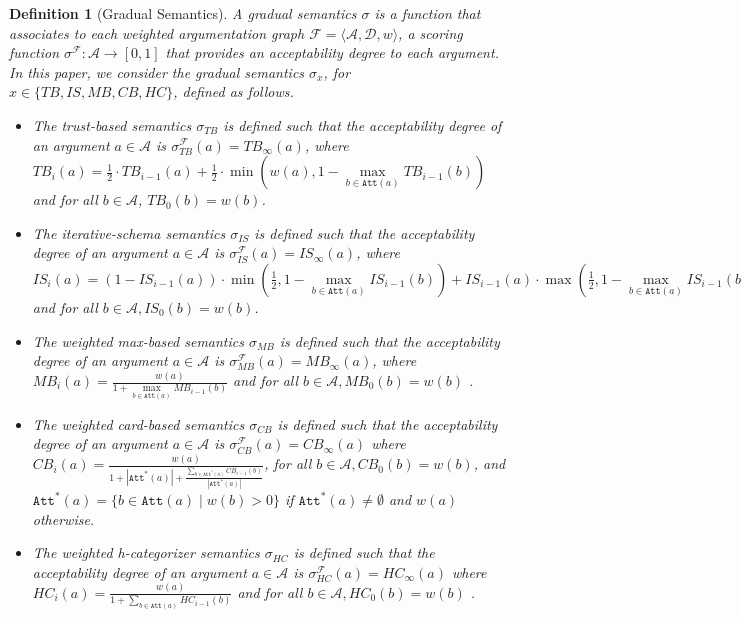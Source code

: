\documentclass{article}
\newcommand{\AF}{\mathcal{F}}
\newcommand{\A}{\mathcal{A}}
\newcommand{\D}{\mathcal{D}}
\newcommand{\Att}{\mathtt{Att}}
\newtheorem{definition}{Definition}
\begin{document}
\begin{definition}[Gradual Semantics]
\label{def:grad_sem}
A gradual semantics $\sigma$ is a function that associates to each weighted argumentation graph $\AF=\langle \A,\D,w \rangle$, a scoring function $\sigma^\AF : \A \to [0,1]$ that provides an acceptability degree to each argument.
%
In this paper, we consider the gradual semantics $\sigma_x$, for $x \in \{TB,IS, MB, CB, HC\}$, defined as follows.
\begin{itemize}
    \item The \emph{trust-based} semantics $\sigma_{TB}$ \cite{TB-sem} is defined such that the acceptability degree of an argument $a\in \A$ is  $\sigma_{TB}^\AF(a)  = TB_\infty(a)$, where
    $TB_i(a) = \frac{1}{2} \cdot TB_{i-1}(a)+\frac{1}{2} \cdot  \min(w(a),1-\max\limits_{b \in \Att(a)} TB_{i-1}(b))$ and for all $b \in \A$, $TB_0(b) = w(b)$.
    
    \item The \emph{iterative-schema} semantics $\sigma_{IS} $ \cite{IS-sem} is defined such that the acceptability degree of an argument $a\in \A$ is $\sigma_{IS}^\AF(a) = IS_\infty(a)$, where $IS_i(a)=(1-IS_{i-1}(a)) \cdot \min(\frac{1}{2},1-\max\limits_{b \in \Att(a)} IS_{i-1}(b))+IS_{i-1}(a) \cdot \max(\frac{1}{2},1-\max\limits_{b \in \Att(a)} IS_{i-1}(b))$ and for all $b \in \A, IS_0(b) = w(b)$.
    
    \item The \emph{weighted max-based} semantics $\sigma_{MB}$ \cite{AMGOUD2022103607} is defined such that the acceptability degree of an argument $a\in \A$ is $\sigma_{MB}^\AF(a) = MB_\infty(a)$, where $MB_i(a)=\frac{w(a)}{1+\max\limits_{b \in \Att(a)} MB_{i-1}(b)}$ and for all $b \in \A, MB_0(b) = w(b)$
    .
    
    
    \item The \emph{weighted card-based} semantics $\sigma_{CB}$ \cite{AMGOUD2022103607} is defined such that the acceptability degree of an argument $a\in \A$ is $\sigma^\AF_{CB}(a) = CB_\infty(a)$ where
    $CB_i(a)=\frac{w(a)}{1+|\Att^*(a)|+ \frac{\sum\limits_{b \in \Att^*(a)} CB_{i-1}(b)}{|\Att^*(a)|}}$, for all $b \in \A, CB_0(b) = w(b)$, and $\Att^*(a) = \{ b \in \Att(a) \mid w(b)>0\}$ if $\Att^*(a) \neq \emptyset$ and $w(a)$ otherwise.
    
    \item The \emph{weighted h-categorizer} semantics $\sigma_{HC} $\cite{AMGOUD2022103607} is defined such that the acceptability degree of an argument $a \in \A$ is $\sigma_{HC}^\AF(a) = HC_\infty(a)$ where
    $HC_i(a)=\frac{w(a)}{1+\sum\limits_{b \in \Att(a)} HC_{i-1}(b)}$ and for all $b \in \A, HC_0(b) = w(b)$
    .
\end{itemize}
\end{definition}
\end{document}
